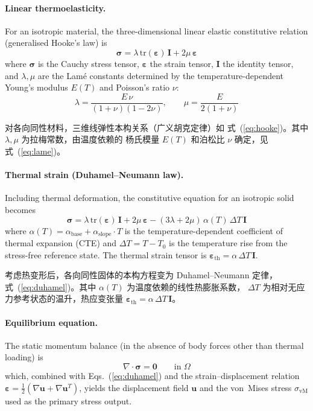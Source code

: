 \documentclass[11pt,a4paper]{article}
\newcommand{\abase}{\ensuremath{\alpha_{\mathrm{base}}}}
\newcommand{\aslope}{\ensuremath{\alpha_{\mathrm{slope}}}}
\begin{document}
\paragraph{Linear thermoelasticity.}
For an isotropic material, the three-dimensional linear elastic
constitutive relation (generalised Hooke's law) is
\begin{equation}
\boldsymbol{\sigma}
= \lambda\,\mathrm{tr}(\boldsymbol{\varepsilon})\,\mathbf{I}
  + 2\mu\,\boldsymbol{\varepsilon}
\label{eq:hooke}
\end{equation}
where $\boldsymbol{\sigma}$ is the Cauchy stress tensor,
$\boldsymbol{\varepsilon}$ the strain tensor, $\mathbf{I}$ the identity
tensor, and $\lambda,\mu$ are the Lam\'{e} constants determined by the
temperature-dependent Young's modulus $E(T)$ and Poisson's ratio $\nu$:
\begin{equation}
\lambda = \frac{E\,\nu}{(1+\nu)(1-2\nu)},
\qquad
\mu = \frac{E}{2(1+\nu)}
\label{eq:lame}
\end{equation}

对各向同性材料，三维线弹性本构关系（广义胡克定律）如
式~(\ref{eq:hooke})。其中 $\lambda,\mu$ 为拉梅常数，由温度依赖的
杨氏模量 $E(T)$ 和泊松比 $\nu$ 确定，见式~(\ref{eq:lame})。

\paragraph{Thermal strain (Duhamel--Neumann law).}
Including thermal deformation, the constitutive equation for an
isotropic solid becomes
\begin{equation}
\boldsymbol{\sigma}
= \lambda\,\mathrm{tr}(\boldsymbol{\varepsilon})\,\mathbf{I}
  + 2\mu\,\boldsymbol{\varepsilon}
  - (3\lambda + 2\mu)\,\alpha(T)\,\Delta T\,\mathbf{I}
\label{eq:duhamel}
\end{equation}
where $\alpha(T) = \abase{} + \aslope{}\cdot T$ is the
temperature-dependent coefficient of thermal expansion (CTE) and
$\Delta T = T - T_0$ is the temperature rise from the stress-free
reference state. The thermal strain tensor is
$\boldsymbol{\varepsilon}_{\mathrm{th}} = \alpha\,\Delta T\,\mathbf{I}$.

考虑热变形后，各向同性固体的本构方程变为 Duhamel--Neumann 定律，
式~(\ref{eq:duhamel})。其中 $\alpha(T)$ 为温度依赖的线性热膨胀系数，
$\Delta T$ 为相对无应力参考状态的温升，热应变张量
$\boldsymbol{\varepsilon}_{\mathrm{th}} = \alpha\,\Delta T\,\mathbf{I}$。

\paragraph{Equilibrium equation.}
The static momentum balance (in the absence of body forces other than
thermal loading) is
\begin{equation}
\nabla \cdot \boldsymbol{\sigma} = \mathbf{0}
\qquad \text{in } \Omega
\end{equation}
which, combined with Eqs.~(\ref{eq:duhamel}) and the strain--displacement
relation
$\boldsymbol{\varepsilon} = \tfrac{1}{2}(\nabla\mathbf{u} +
\nabla\mathbf{u}^T)$, yields the displacement field $\mathbf{u}$ and
the von~Mises stress $\sigma_\mathrm{vM}$ used as the primary stress
output.
\end{document}
